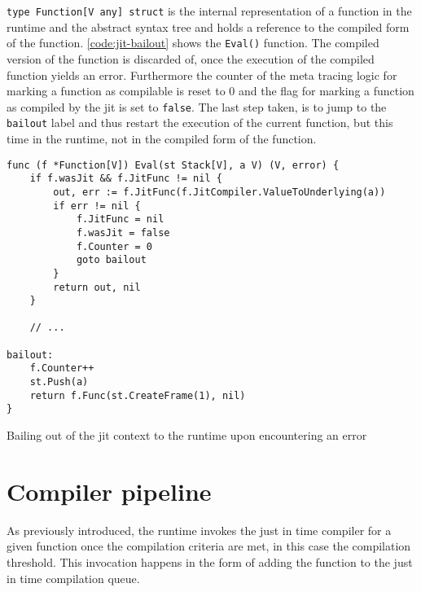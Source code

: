 \texttt{type Function[V any] struct} is the internal representation of
a function in the runtime and the abstract syntax tree and holds a reference to
the compiled form of the function. \autoref{code:jit-bailout} shows the
\texttt{Eval()} function. The compiled version of the function is discarded of,
once the execution of the compiled function yields an error. Furthermore the
counter of the meta tracing logic for marking a function as compilable is reset
to $0$ and the flag for marking a function as compiled by the jit is set to
\texttt{false}. The last step taken, is to jump to the \texttt{bailout} label
and thus restart the execution of the current function, but this time in the
runtime, not in the compiled form of the function.

\begin{listing}[H]
    \begin{verbatim}
func (f *Function[V]) Eval(st Stack[V], a V) (V, error) {
    if f.wasJit && f.JitFunc != nil {
        out, err := f.JitFunc(f.JitCompiler.ValueToUnderlying(a))
        if err != nil {
            f.JitFunc = nil
            f.wasJit = false
            f.Counter = 0
            goto bailout
        }
        return out, nil
    }

    // ...

bailout:
    f.Counter++
    st.Push(a)
    return f.Func(st.CreateFrame(1), nil)
}
    \end{verbatim}
    \caption{Bailing out of the jit context to the runtime upon encountering an error}
    \label{code:jit-bailout}
\end{listing}

\section{Compiler pipeline}
\label{sec:compiler-pipeline}

As previously introduced, the runtime invokes the just in time compiler for
a given function once the compilation criteria are met, in this case the
compilation threshold. This invocation happens in the form of adding the
function to the just in time compilation queue. 

